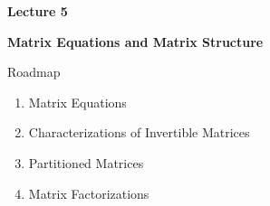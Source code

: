 \begin{frame}[plain]
  \vfill
  {\Huge\color{lecturegreen}\bfseries Lecture 5}
  \bigskip

  {\Huge\color{lecturegreen}\bfseries Matrix Equations and Matrix Structure}
  \vfill
\end{frame}

\begin{frame}{Roadmap}
  \begin{enumerate}
    \item Matrix Equations
    \item Characterizations of Invertible Matrices
    \item Partitioned Matrices
    \item Matrix Factorizations
  \end{enumerate}
\end{frame}
